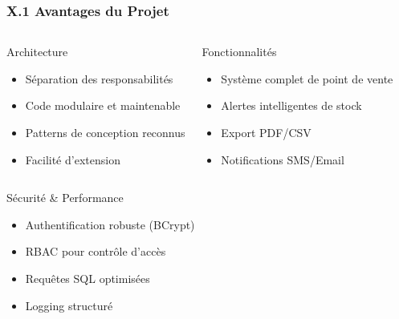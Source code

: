 \documentclass[11pt, aspectratio=169]{beamer}
\begin{document}
\begin{frame}
    \frametitle{X.1 Avantages du Projet}
    
    \begin{columns}[T]
        \begin{block}{Architecture}
            \begin{itemize}
                \item[\faCheckCircle] Séparation des responsabilités
                \item[\faCheckCircle] Code modulaire et maintenable
                \item[\faCheckCircle] Patterns de conception reconnus
                \item[\faCheckCircle] Facilité d'extension
            \end{itemize}
        \end{block}
        
        \begin{block}{Fonctionnalités}
            \begin{itemize}
                \item[\faCheckCircle] Système complet de point de vente
                \item[\faCheckCircle] Alertes intelligentes de stock
                \item[\faCheckCircle] Export PDF/CSV
                \item[\faCheckCircle] Notifications SMS/Email
            \end{itemize}
        \end{block}
    \end{columns}
    
    \vspace{1cm}
    
    \begin{block}{Sécurité \& Performance}
        \begin{itemize}
            \item[\faCheckCircle] Authentification robuste (BCrypt)
            \item[\faCheckCircle] RBAC pour contrôle d'accès
            \item[\faCheckCircle] Requêtes SQL optimisées
            \item[\faCheckCircle] Logging structuré
        \end{itemize}
    \end{block}
\end{frame}
\end{document}
